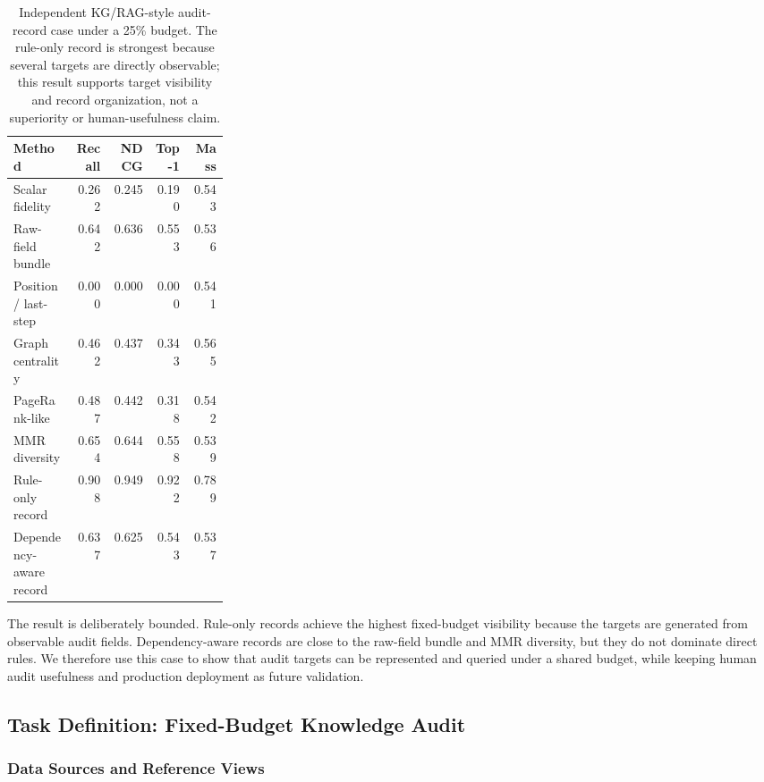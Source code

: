 \documentclass[pdflatex,sn-mathphys-num,iicol]{sn-jnl}
\begin{document}
\begin{table}[ht]
\caption{Independent KG/RAG-style audit-record case under a 25\% budget. The rule-only record is strongest because several targets are directly observable; this result supports target visibility and record organization, not a superiority or human-usefulness claim.}
\label{tab:jiis-audit-case}
\centering
\small
\renewcommand{\arraystretch}{1.06}
\begin{tabular}{Z{0.28\linewidth}rrrr}
\toprule
\textbf{Method} & \textbf{Recall} & \textbf{NDCG} & \textbf{Top-1} & \textbf{Mass} \\
\midrule
Scalar fidelity & 0.262 & 0.245 & 0.190 & 0.543 \\
Raw-field bundle & 0.642 & 0.636 & 0.553 & 0.536 \\
Position / last-step & 0.000 & 0.000 & 0.000 & 0.541 \\
Graph centrality & 0.462 & 0.437 & 0.343 & 0.565 \\
PageRank-like & 0.487 & 0.442 & 0.318 & 0.542 \\
MMR diversity & 0.654 & 0.644 & 0.558 & 0.539 \\
Rule-only record & 0.908 & 0.949 & 0.922 & 0.789 \\
Dependency-aware record & 0.637 & 0.625 & 0.543 & 0.537 \\
\bottomrule
\end{tabular}
\end{table}

The result is deliberately bounded. Rule-only records achieve the highest fixed-budget visibility because the targets are generated from observable audit fields. Dependency-aware records are close to the raw-field bundle and MMR diversity, but they do not dominate direct rules. We therefore use this case to show that audit targets can be represented and queried under a shared budget, while keeping human audit usefulness and production deployment as future validation.

\subsection{Task Definition: Fixed-Budget Knowledge Audit}
\label{sec:application-setup}

\subsubsection{Data Sources and Reference Views}
\end{document}
